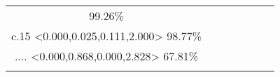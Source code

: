 \documentclass[8pt, a4paper]{article}
\begin{document}
\begin{landscape}
\begin{tabular}{|c|c|c|c|c|c|c|}
99.26\%\\c.15 <0.000,0.025,0.111,2.000> 98.77\%\\.... <0.000,0.868,0.000,2.828> 67.81\%\\} \\
\hline
\end{tabular}\newpage
\end{landscape}
\end{document}
